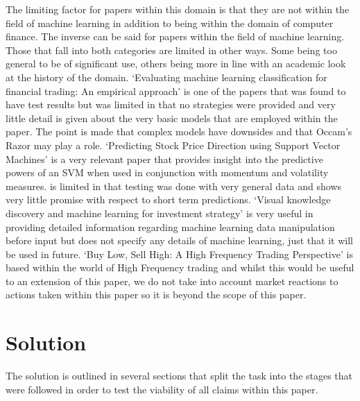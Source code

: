 \documentclass[conference]{IEEEtran}
\begin{document}
The limiting factor for papers within this domain is that they are not within the field of machine learning in addition to being within the domain of computer finance. The inverse can be said for papers within the field of machine learning. Those that fall into both categories are limited in other ways. Some being too general to be of significant use, others being more in line with an academic look at the history of the domain. `Evaluating machine learning classification for financial trading: An empirical approach' \cite{Gerlein2016} is one of the papers that was found to have test results but was limited in that no strategies were provided and very little detail is given about the very basic models that are employed within the paper. The point is made that complex models have downsides and that Occam's Razor may play a role. `Predicting Stock Price Direction using Support Vector Machines' \cite{MadgeAdvisor} is a very relevant paper that provides insight into the predictive powers of an SVM when used in conjunction with momentum and volatility measures. \cite{MadgeAdvisor} is limited in that testing was done with very general data and shows very little promise with respect to short term predictions. `Visual knowledge discovery and machine learning for investment strategy' \cite{Wilinski2017} is very useful in providing detailed information regarding machine learning data manipulation before input but does not specify any details of machine learning, just that it will be used in future. `Buy Low, Sell High: A High Frequency Trading Perspective' \cite{Cartea2014} is based within the world of High Frequency trading and whilst this would be useful to an extension of this paper, we do not take into account market reactions to actions taken within this paper so it is beyond the scope of this paper.

\section{Solution}

The solution is outlined in several sections that split the task into the stages that were followed in order to test the viability of all claims within this paper.
\end{document}
